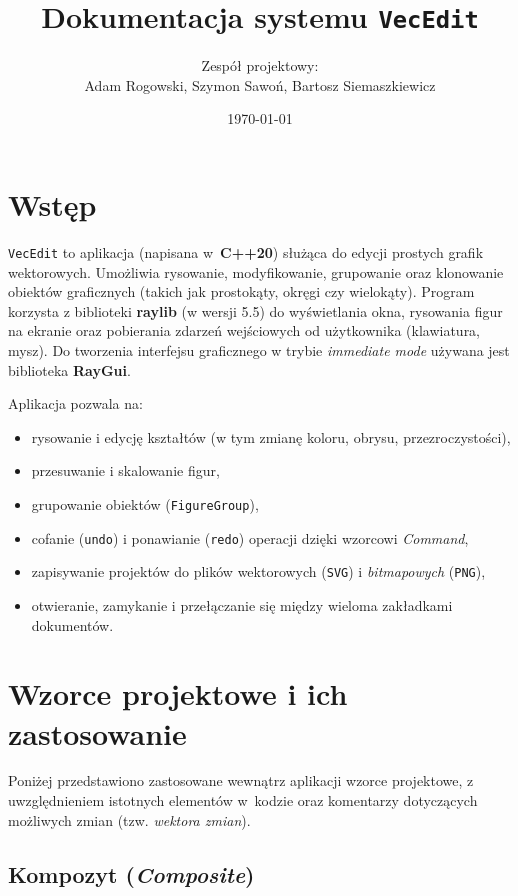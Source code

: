 \documentclass[a4paper,12pt]{article}
\title{\textbf{Dokumentacja systemu \texttt{VecEdit}}}
\author{Zespół projektowy: \\
\small Adam Rogowski, Szymon Sawoń, Bartosz Siemaszkiewicz}
\date{\today}
\begin{document}
\maketitle
\tableofcontents

\vfill

\section{Wstęp}

\texttt{VecEdit} to aplikacja (napisana w~\textbf{C++20}) służąca do edycji prostych
grafik wektorowych. Umożliwia rysowanie, modyfikowanie, grupowanie oraz klonowanie
obiektów graficznych (takich jak prostokąty, okręgi czy wielokąty). 
Program korzysta z biblioteki \textbf{raylib} (w wersji 5.5) do wyświetlania okna, 
rysowania figur na ekranie oraz pobierania zdarzeń wejściowych od użytkownika 
(klawiatura, mysz). Do tworzenia interfejsu graficznego w trybie \emph{immediate mode}
używana jest biblioteka \textbf{RayGui}.  

Aplikacja pozwala na:
\begin{itemize}
    \item rysowanie i edycję kształtów (w tym zmianę koloru, obrysu, przezroczystości),
    \item przesuwanie i skalowanie figur,
    \item grupowanie obiektów (\texttt{FigureGroup}),
    \item cofanie (\texttt{undo}) i ponawianie (\texttt{redo}) operacji dzięki wzorcowi \emph{Command},
    \item zapisywanie projektów do plików wektorowych (\texttt{SVG}) i \emph{bitmapowych} (\texttt{PNG}),
    \item otwieranie, zamykanie i przełączanie się między wieloma zakładkami dokumentów.
\end{itemize}

\pagebreak

\section{Wzorce projektowe i ich zastosowanie}

Poniżej przedstawiono zastosowane wewnątrz aplikacji wzorce projektowe,
z uwzględnieniem istotnych elementów w~kodzie oraz komentarzy dotyczących
możliwych zmian (tzw. \emph{wektora zmian}).

\subsection{Kompozyt (\emph{Composite})}
\end{document}
